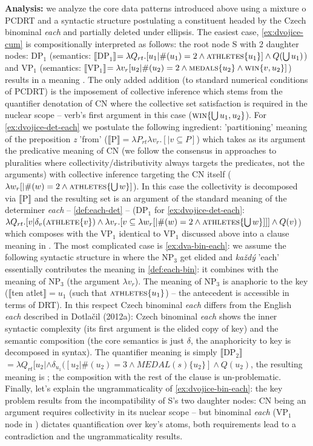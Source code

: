 \documentclass[12pt, a4paper]{scrartcl}
\newcommand{\lb}{\llbracket}
\newcommand{\rb}{\rrbracket}
\newcommand{\sx}[1]{$\lb${#1}$\rb$}
\begin{document}
\textbf{Analysis:} we analyze the core data patterns introduced above using a mixture o PCDRT and a syntactic structure postulating a constituent headed by the Czech binominal \textit{each} and partially deleted under ellipsis. The easiest case, \ref{ex:dvojice-cum} is compositionally interpreted as follows: the root node S with 2 daughter nodes: DP$_1$ (semantics: \sx{DP$_1$}$=\lambda Q_{rt}.[u_1| \#(u_1)=2 \wedge \textsc{athletes}\{u_1\}] \wedge Q(\bigcup u_1)$) and VP$_1$ (semantics:
 \sx{VP$_1$}$=\lambda v_r[u_2 | \#(u_2)=2 \wedge \textsc{medals}\{u_2\} \wedge \textsc{win}\{v,u_2\}]$) results in a meaning \NNext[a]. The only added addition (to standard numerical conditions of PCDRT) is the imposement of collective inference which stems from the quantifier denotation of CN where the collective set satisfaction is required in the nuclear scope -- verb's first argument in this case ($\textsc{win}\{\bigcup u_1,u_2\}$). For \ref{ex:dvojice-det-each} we postulate the following ingredient: 'partitioning' meaning of the preposition \textit{z} 'from' (\sx{P}${}=\lambda P_{rt}\lambda v_r.[| v\subseteq P]$) which takes as its argument the predicative meaning of CN (we follow the consensus in approaches to pluralities where collectivity/distributivity always targets the predicates, not the arguments) with collective inference targeting the CN itself ($\lambda w_r[|\#(w)=2 \wedge \textsc{athletes}\{\bigcup w\}]$). In this case the collectivity is decomposed via \sx{P} and the resulting set is an argument of the standard meaning of the determiner \textit{each} -- \ref{def:each-det} -- (DP$_1$ for \ref{ex:dvojice-det-each}: $\lambda Q_{rt}.[v|\delta_{v}(\textsc{athlete}\{v\}) \wedge \lambda v_r.[v \subseteq \lambda w_r[|\#(w)=2 \wedge \textsc{athletes}\{\bigcup w\}]]] \wedge Q(v)$) which composes with the VP$_1$ identical to VP$_1$ discussed above into a clause meaning in \NNext[b]. The most complicated case is \ref{ex:dva-bin-each}: we assume the following syntactic structure in \Next where the NP$_3$ get elided and \textit{každý} 'each' essentially contributes the meaning in \ref{def:each-bin}: it combines with the meaning of NP$_3$ (the argument $\lambda v_r$). The meaning of NP$_3$ is anaphoric to the key (\sx{ten atlet}${}=u_1$ (such that $\textsc{athletes}\{u_1\}$) -- the antecedent is accessible in terms of DRT). In this respect Czech binominal \textit{each} differs from the English \textit{each} described in Dotlačil (2012a): Czech binominal \textit{each} shows the inner syntactic complexity (its first argument is the elided copy of key) and the semantic composition (the core semantics is just $\delta$, the anaphoricity to key is decomposed in syntax). The quantifier meaning is simply \sx{DP$_2$}$=\lambda Q_{rt}[u_2 | \wedge \delta_{u_1}([u_2| \#(u_2)=3 \wedge MEDAL(s)\{u_2\}] \wedge Q(u_2)$, the resulting meaning is \NNext[c]; the composition with the rest of the clause is un-problematic. Finally, let's explain the ungrammaticality of \ref{ex:dvojice-bin-each}: the key problem results from the incompatibility of S's two daughter nodes: CN being an argument requires collectivity in its nuclear scope -- \NNext[d-i] but binominal \textit{each} (VP$_1$ node in \NNext[d-ii]) dictates quantification over key's atoms, both requirements lead to a contradiction and the ungrammaticality results.
\end{document}
